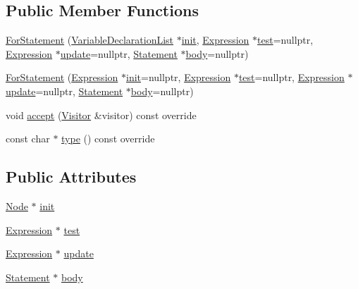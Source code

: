 \subsection*{Public Member Functions}
\begin{DoxyCompactItemize}
\item 
\hyperlink{struct_for_statement_ac6f0bfa1c5a48bcf2ed048639e13cd16}{For\+Statement} (\hyperlink{struct_variable_declaration_list}{Variable\+Declaration\+List} $\ast$\hyperlink{struct_for_statement_aa4516b04bff706f5ad80915357da05e5}{init}, \hyperlink{struct_expression}{Expression} $\ast$\hyperlink{struct_for_statement_a97f163e3d73072eccf4b86120ee17efb}{test}=nullptr, \hyperlink{struct_expression}{Expression} $\ast$\hyperlink{struct_for_statement_ae0e9d64880b5db76426fdb453275fd90}{update}=nullptr, \hyperlink{struct_statement}{Statement} $\ast$\hyperlink{struct_for_statement_a8d9018f1d05bcd027122c9dcabb0e3ba}{body}=nullptr)
\item 
\hyperlink{struct_for_statement_a3073886e1dc3db4bd301331596da922b}{For\+Statement} (\hyperlink{struct_expression}{Expression} $\ast$\hyperlink{struct_for_statement_aa4516b04bff706f5ad80915357da05e5}{init}=nullptr, \hyperlink{struct_expression}{Expression} $\ast$\hyperlink{struct_for_statement_a97f163e3d73072eccf4b86120ee17efb}{test}=nullptr, \hyperlink{struct_expression}{Expression} $\ast$\hyperlink{struct_for_statement_ae0e9d64880b5db76426fdb453275fd90}{update}=nullptr, \hyperlink{struct_statement}{Statement} $\ast$\hyperlink{struct_for_statement_a8d9018f1d05bcd027122c9dcabb0e3ba}{body}=nullptr)
\item 
void \hyperlink{struct_for_statement_acc3a0ac5de61092f0d7be7921b31d47d}{accept} (\hyperlink{struct_visitor}{Visitor} \&visitor) const override
\item 
const char $\ast$ \hyperlink{struct_for_statement_acf0f64ddd1a41763f15af08813b0bea6}{type} () const override
\end{DoxyCompactItemize}
\subsection*{Public Attributes}
\begin{DoxyCompactItemize}
\item 
\hyperlink{struct_node}{Node} $\ast$ \hyperlink{struct_for_statement_aa4516b04bff706f5ad80915357da05e5}{init}
\item 
\hyperlink{struct_expression}{Expression} $\ast$ \hyperlink{struct_for_statement_a97f163e3d73072eccf4b86120ee17efb}{test}
\item 
\hyperlink{struct_expression}{Expression} $\ast$ \hyperlink{struct_for_statement_ae0e9d64880b5db76426fdb453275fd90}{update}
\item 
\hyperlink{struct_statement}{Statement} $\ast$ \hyperlink{struct_for_statement_a8d9018f1d05bcd027122c9dcabb0e3ba}{body}
\end{DoxyCompactItemize}


